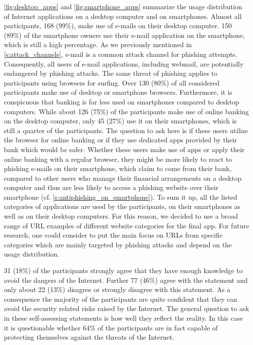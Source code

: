 \begin{description}[leftmargin=0cm]
	\item[Usage Distribution of Internet Applications:] \autoref{fig:desktop_apps} and \autoref{fig:smartphone_apps} summarize the usage distribution of Internet applications on a desktop computer and on smartphones.
 Almost all participants, 168 (99\%), make use of e-mails on their desktop computer.
 150 (89\%) of the smartphone owners use their e-mail application on the smartphone, which is still a high percentage.
 As we previously mentioned in \autoref{s:attack_channels}, e-mail is a common attack channel for phishing attempts.
 Consequently, all users of e-mail applications, including webmail, are potentially endangered by phishing attacks.
 The same threat of phishing applies to participants using browsers for surfing.
 Over 130 (80\%) of all considered participants make use of desktop or smartphone browsers.
 Furthermore, it is conspicuous that banking is far less used on smartphones compared to desktop computers.
 While about 126 (75\%) of the participants make use of online banking on the desktop computer, only 45 (27\%) use it on their smartphones, which is still a quarter of the participants.
	The question to ask here is if these users utilize the browser for online banking or if they use dedicated apps provided by their bank which would be safer.
 Whether these users make use of apps or apply their online banking with a regular browser, they might be more likely to react to phishing e-mails on their smartphone, which claim to come from their bank, compared to other users who manage their financial arrangements on a desktop computer and thus are less likely to access a phishing website over their smartphone (cf. \autoref{s:antiphishing_on_smartphone}). To sum it up, all the listed categories of applications are used by the participants, on their smartphones as well as on their desktop computers.
 For this reason, we decided to use a broad range of URL examples of different website categories for the final app.
 For future research, one could consider to put the main focus on URLs from specific categories which are mainly targeted by phishing attacks and depend on the usage distribution.


	\item[Self-Assessment - Knowledge to avoid dangers of Internet:] 31 (18\%) of the participants strongly agree that they have enough knowledge to avoid the dangers of the Internet. Further 77 (46\%) agree with the statement and only about 22 (13\%) disagree or strongly disagree with this statement.
 As a consequence the majority of the participants are quite confident that they can avoid the security related risks raised by the Internet.
The general question to ask in these self-assessing statements is how well they reflect the reality.
In this case it is questionable whether 64\% of the participants are in fact capable of protecting themselves against the threats of the Internet.
	

\end{description}
